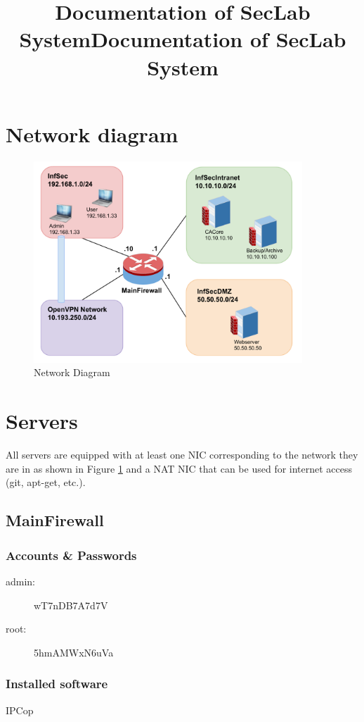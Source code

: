 \documentclass[a4paper,11pt]{article}
\title{Documentation of SecLab System}
\begin{document}
\title{Documentation of SecLab System}

\section{Network diagram}

\begin{figure}[H]
  \centering
    \includegraphics[width=0.9\textwidth]{sysseclab_net_diagram.pdf}  
  \caption{Network Diagram}
  \label{netdiag}
\end{figure}

\section{Servers}
All servers are equipped with at least one NIC corresponding to the network they are in as shown in Figure \ref{netdiag} and a NAT NIC that can be used for internet access (git, apt-get, etc.).
\subsection{MainFirewall}
\subsubsection*{Accounts \& Passwords}
\begin{multicols}{2}
\begin{description}
\item[admin:] wT7nDB7A7d7V
\item[root:] 5hmAMWxN6uVa
\end{description}
\end{multicols}
\subsubsection*{Installed software}
IPCop
\end{document}
